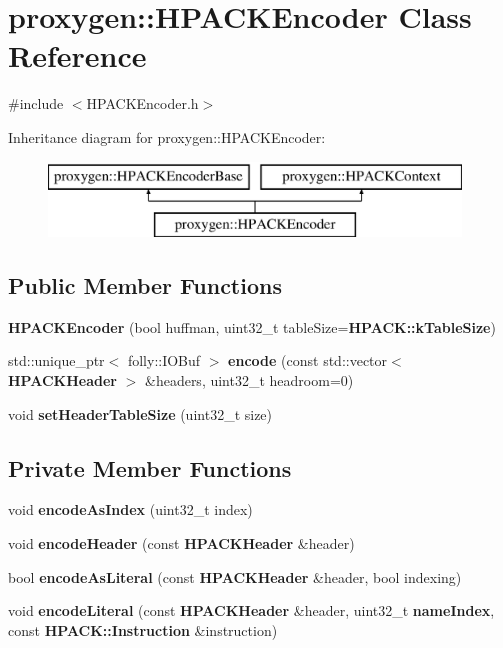 \section{proxygen\+:\+:H\+P\+A\+C\+K\+Encoder Class Reference}
\label{classproxygen_1_1HPACKEncoder}


{\ttfamily \#include $<$H\+P\+A\+C\+K\+Encoder.\+h$>$}

Inheritance diagram for proxygen\+:\+:H\+P\+A\+C\+K\+Encoder\+:\begin{figure}[H]
\begin{center}
\leavevmode
\includegraphics[height=2.000000cm]{classproxygen_1_1HPACKEncoder}
\end{center}
\end{figure}
\subsection*{Public Member Functions}
\begin{DoxyCompactItemize}
\item 
{\bf H\+P\+A\+C\+K\+Encoder} (bool huffman, uint32\+\_\+t table\+Size={\bf H\+P\+A\+C\+K\+::k\+Table\+Size})
\item 
std\+::unique\+\_\+ptr$<$ folly\+::\+I\+O\+Buf $>$ {\bf encode} (const std\+::vector$<$ {\bf H\+P\+A\+C\+K\+Header} $>$ \&headers, uint32\+\_\+t headroom=0)
\item 
void {\bf set\+Header\+Table\+Size} (uint32\+\_\+t size)
\end{DoxyCompactItemize}
\subsection*{Private Member Functions}
\begin{DoxyCompactItemize}
\item 
void {\bf encode\+As\+Index} (uint32\+\_\+t index)
\item 
void {\bf encode\+Header} (const {\bf H\+P\+A\+C\+K\+Header} \&header)
\item 
bool {\bf encode\+As\+Literal} (const {\bf H\+P\+A\+C\+K\+Header} \&header, bool indexing)
\item 
void {\bf encode\+Literal} (const {\bf H\+P\+A\+C\+K\+Header} \&header, uint32\+\_\+t {\bf name\+Index}, const {\bf H\+P\+A\+C\+K\+::\+Instruction} \&instruction)
\end{DoxyCompactItemize}
